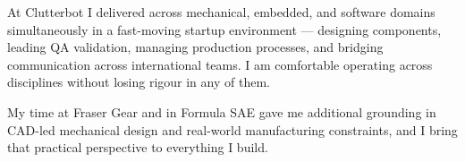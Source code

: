 At Clutterbot I delivered across mechanical, embedded, and software domains simultaneously
in a fast-moving startup environment --- designing components, leading QA validation,
managing production processes, and bridging communication across international teams.
I am comfortable operating across disciplines without losing rigour in any of them.

My time at Fraser Gear and in Formula SAE gave me additional grounding in CAD-led
mechanical design and real-world manufacturing constraints, and I bring that practical
perspective to everything I build.
